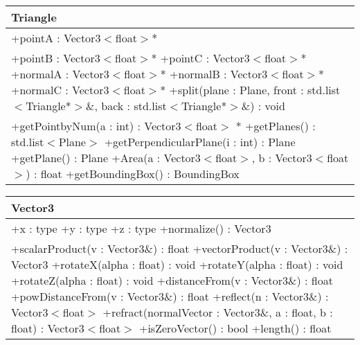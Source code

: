 \begin{center}
    \begin{tabular}{|l|}
    \hline
    Triangle \\ \hline
    +pointA : Vector3$<$float$>$* \\
    +pointB : Vector3$<$float$>$*
    +pointC : Vector3$<$float$>$*
    +normalA : Vector3$<$float$>$*
    +normalB : Vector3$<$float$>$*
    +normalC : Vector3$<$float$>$*
    \hline
	+split(plane : Plane, front : std.list$<$Triangle*$>$\&, back : std.list$<$Triangle*$>$\&) : void \\ 
	+getPointbyNum(a : int) : Vector3$<$float$>$ *
	+getPlanes() : std.list$<$Plane$>$
	+getPerpendicularPlane(i : int) : Plane
	+getPlane() : Plane
	+Area(a : Vector3$<$float$>$, b : Vector3$<$float$>$) : float
	+getBoundingBox() : BoundingBox
	\hline
    \end{tabular}
\end{center}


\begin{center}
    \begin{tabular}{|l|}
    \hline
    Vector3 \\ \hline
    +x : type
    +y : type
    +z : type
     \hline
	+normalize() : Vector3 \\ 
	+scalarProduct(v : Vector3\&) : float
	+vectorProduct(v : Vector3\&) : Vector3
	+rotateX(alpha : float) : void
	+rotateY(alpha : float) : void
	+rotateZ(alpha : float) : void
	+distanceFrom(v : Vector3\&) : float
	+powDistanceFrom(v : Vector3\&) : float
	+reflect(n : Vector3\&) : Vector3$<$float$>$
	+refract(normalVector : Vector3\&, a : float, b : float) : Vector3$<$float$>$
	+isZeroVector() : bool
	+length() : float
	\hline
    \end{tabular}
\end{center}


